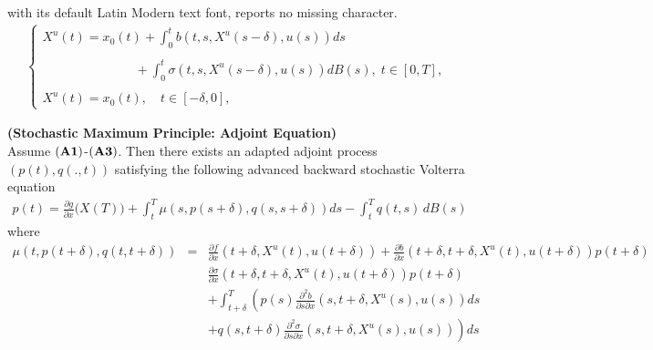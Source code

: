 \documentclass[10pt,a4paper]{amsart}
\begin{document}
with its default Latin Modern text font, reports no missing character.
\begin{eqnarray}\label{ee1}
\left\{
\begin{array}{l}
\displaystyle X^{u}(t)= x_{0}(t)+ \int_{0}^{t}b(t,s,X^{u}(s-\delta),u(s)) ds\\\\\;\;\;\;\;\;\;\;\;\;\;\;\;\;\;\;\;\;\;\;\;\;\;\;\;\; +\displaystyle\int_{0}^{t} \sigma(t,s,X^{u}(s-\delta),u(s))dB(s), \; 	t \in [0,T],\\\\
X^{u}(t) = x_{0}(t), \quad t \in [-\delta, 0],
\end{array}\right.
\end{eqnarray}

\begin{theorem}{\textbf{(Stochastic Maximum Principle: Adjoint Equation)}}\label{1}\\
Assume $({\bf A1})$-$({\bf A3})$. Then there exists an adapted adjoint process $(p(t), q(.,t))$ satisfying the following advanced backward stochastic Volterra equation  
\begin{eqnarray}\label{p}
p(t) = \frac{\partial g}{\partial x}\big(X(T)\big)+\int_t^T\mu(s,p(s+\delta),q(s,s+\delta))ds- \int_t^T q(t,s)\, dB(s)
\end{eqnarray}
where  
\begin{eqnarray*}
\mu(t,p(t+\delta),q(t,t+\delta))&=&\frac{\partial f}{\partial x}(t+\delta,X^{u}(t),u(t+\delta)) + \frac{\partial b}{\partial x}(t+\delta,t+\delta,X^{u}(t),u(t+\delta))p(t+\delta)\\
&&\frac{\partial \sigma}{\partial x}(t+\delta,t+\delta,X^{u}(t),u(t+\delta))p(t+\delta)\\
&&+\int_{t+\delta}^{T}\left(p(s) \frac{\partial^2 b}{\partial s \partial x}(s,t+\delta,X^{u}(s),u(s))ds\right.\\
&&\left.+q(s,t+\delta) \frac{\partial^2 \sigma}{\partial s \partial x}(s,t+\delta,X^{u}(s),u(s))\right)ds
\end{eqnarray*}
\end{theorem}
\end{document}
